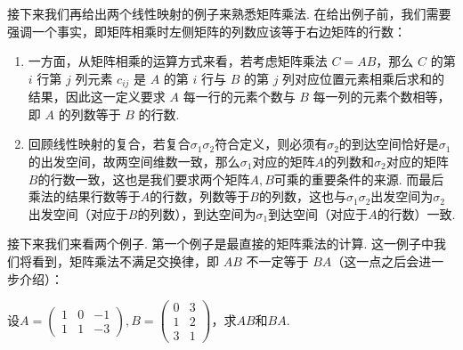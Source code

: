接下来我们再给出两个线性映射的例子来熟悉矩阵乘法. 在给出例子前，我们需要强调一个事实，即矩阵相乘时左侧矩阵的列数应该等于右边矩阵的行数：
\begin{enumerate}
    \item 一方面，从矩阵相乘的运算方式来看，若考虑矩阵乘法 $C = AB$，那么 $C$ 的第 $i$ 行第 $j$ 列元素 $c_{ij}$ 是 $A$ 的第 $i$ 行与 $B$ 的第 $j$ 列对应位置元素相乘后求和的结果，因此这一定义要求 $A$ 每一行的元素个数与 $B$ 每一列的元素个数相等，即 $A$ 的列数等于 $B$ 的行数.
    \item 回顾线性映射的复合，若复合$\sigma_1\sigma_2$符合定义，则必须有$\sigma_2$的到达空间恰好是$\sigma_1$的出发空间，故两空间维数一致，那么$\sigma_1$对应的矩阵$A$的列数和$\sigma_2$对应的矩阵$B$的行数一致，这也是我们要求两个矩阵$A,B$可乘的重要条件的来源. 而最后乘法的结果行数等于$A$的行数，列数等于$B$的列数，这也与$\sigma_1\sigma_2$出发空间为$\sigma_2$出发空间（对应于$B$的列数），到达空间为$\sigma_1$到达空间（对应于$A$的行数）一致.
\end{enumerate}

接下来我们来看两个例子. 第一个例子是最直接的矩阵乘法的计算. 这一例子中我们将看到，矩阵乘法不满足交换律，即 $AB$ 不一定等于 $BA$（这一点之后会进一步介绍）：
\begin{example}{}{}
    设$A=\begin{pmatrix}
            1 & 0 & -1 \\
            1 & 1 & -3
        \end{pmatrix}, B=\begin{pmatrix}
            0 & 3 \\
            1 & 2 \\
            3 & 1
        \end{pmatrix}$，求$AB$和$BA$.
\end{example}

